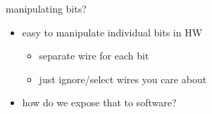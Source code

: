
\begin{frame}{manipulating bits?}
    \begin{itemize}
    \item easy to manipulate individual bits in HW
        \begin{itemize}
        \item separate wire for each bit
        \item just ignore/select wires you care about
        \end{itemize}
    \item how do we expose that to software?
    \end{itemize}
\end{frame}

